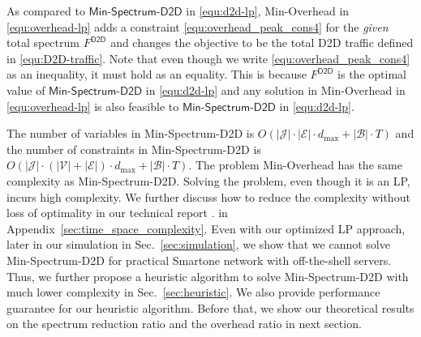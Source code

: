 As compared to $\textsf{Min-Spectrum-D2D}$ in \eqref{equ:d2d-lp},
\textsf{Min-Overhead} in \eqref{equ:overhead-lp} adds a constraint
\eqref{equ:overhead_peak_cons4} for the \emph{given} total spectrum
$F^{\textsf{D2D}}$ and changes the objective to be
the total D2D traffic defined in \eqref{equ:D2D-traffic}.
Note that even though we write \eqref{equ:overhead_peak_cons4}
as an inequality, it must hold as an equality. This is because
$F^{\textsf{D2D}}$ is  the optimal value of $\textsf{Min-Spectrum-D2D}$ in \eqref{equ:d2d-lp}
and any solution in \textsf{Min-Overhead} in \eqref{equ:overhead-lp} is also feasible
to $\textsf{Min-Spectrum-D2D}$ in \eqref{equ:d2d-lp}.

The number of variables in \textsf{Min-Spectrum-D2D}  is
$O(|\mathcal{J}|\cdot|\mathcal{E}|\cdot d_{\max} + |\mathcal{B}| \cdot T)$
and the number of constraints in \textsf{Min-Spectrum-D2D}  is
$O(|\mathcal{J}| \cdot (|\mathcal{V}|+|\mathcal{E}|) \cdot d_{\max} + |\mathcal{B}| \cdot T )$.
The problem \textsf{Min-Overhead} has the same complexity as
 \textsf{Min-Spectrum-D2D}.
Solving the problem, even though it is an LP, incurs high complexity.
We further discuss how to reduce the complexity without loss of optimality
\ifx \ISTR \undefined
in our technical report \cite{TR}.
\else
in Appendix~\ref{sec:time_space_complexity}.
\fi
Even with our optimized LP approach,
later in our simulation in Sec.~\ref{sec:simulation}, we show that we cannot
solve \textsf{Min-Spectrum-D2D} for  practical Smartone network
with off-the-shell servers. Thus, we further propose a heuristic algorithm
to solve \textsf{Min-Spectrum-D2D} with much lower complexity in Sec.~\ref{sec:heuristic}.
We also provide performance guarantee for our heuristic algorithm.
Before that, we show our theoretical results on the spectrum reduction ratio and the overhead ratio
in next section.


